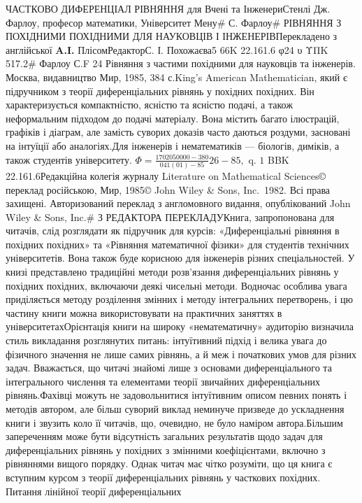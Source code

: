 \documentclass[
  ukrainian,
]{article}
\author{}
\date{}
\begin{document}
ЧАСТКОВО ДИФЕРЕНЦІАЛ РІВНЯННЯ для Вчені та ІнженериСтенлі Дж. Фарлоу,
професор математики, Університет Мену\# С. Фарлоу\# РІВНЯННЯ З ПОХІДНИМИ
ПОХІДНИМИ ДЛЯ НАУКОВЦІВ І ІНЖЕНЕРІВПерекладено з англійської
\textbf{A.I.} ПлісомРедакторС. І. Похожаєва5\textbar{} 66K 22.161.6 φ24
υ ΥΠΚ 517.2\# Фарлоу С.F 24 Рівняння з частими похідними для науковців
та інженерів. Москва, видавництво Мир, 1985, 384 с.King's American
Mathematician, який є підручником з теорії диференціальних рівнянь у
похідних похідних. Він характеризується компактністю, ясністю та ясністю
подачі, а також неформальним підходом до подачі матеріалу. Вона містить
багато ілюстрацій, графіків і діаграм, але замість суворих доказів часто
даються роздуми, засновані на інтуїції або аналогіях.Для інженерів і
нематематиків --- біологів, диміків, а також студентів університету.
\(\Phi = \frac{1702050000-380}{041(01)-85} 26-85, \text{ q. 1}\) BBK
22.161.6Редакційна колегія журналу Literature on Mathematical Sciences©
переклад російською, Мир, 1985© John Wiley \& Sons, Inc.~1982. Всі права
захищені. Авторизований переклад з англомовного видання, опублікований
John Wiley \& Sons, Inc.\# З РЕДАКТОРА ПЕРЕКЛАДУКнига, запропонована для
читачів, слід розглядати як підручник для курсів: «Диференціальні
рівняння в похідних похідних» та «Рівняння математичної фізики» для
студентів технічних університетів. Вона також буде корисною для
інженерів різних спеціальностей. У книзі представлено традиційні методи
розв'язання диференціальних рівнянь у похідних похідних, включаючи деякі
чисельні методи. Водночас особлива увага приділяється методу розділення
змінних і методу інтегральних перетворень, і цю частину книги можна
використовувати на практичних заняттях в університетахОрієнтація книги
на широку «нематематичну» аудиторію визначила стиль викладання
розглянутих питань: інтуїтивний підхід і велика увага до фізичного
значення не лише самих рівнянь, а й меж і початкових умов для різних
задач. Вважається, що читачі знайомі лише з основами диференціального та
інтегрального числення та елементами теорії звичайних диференціальних
рівнянь.Фахівці можуть не задовольнитися інтуїтивним описом певних
понять і методів автором, але більш суворий виклад неминуче призведе до
ускладнення книги і звузить коло її читачів, що, очевидно, не було
наміром автора.Більшим запереченням може бути відсутність загальних
результатів щодо задач для диференціальних рівнянь у похідних з змінними
коефіцієнтами, включно з рівняннями вищого порядку. Однак читач має
чітко розуміти, що ця книга є вступним курсом з теорії диференціальних
рівнянь у часткових похідних. Питання лінійної теорії диференціальних
\end{document}
